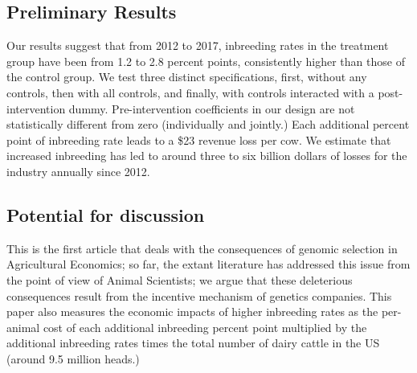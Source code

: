 \documentclass[12pt,letterpaper]{article}
\begin{document}
\subsection*{Preliminary Results}
Our results suggest that from 2012 to 2017, inbreeding rates in the treatment group have been from 1.2 to 2.8 percent points, consistently higher than those of the control group. We test three distinct specifications, first, without any controls, then with all controls, and finally, with controls interacted with a post-intervention dummy. Pre-intervention coefficients in our design are not statistically different from zero (individually and jointly.) Each additional percent point of inbreeding rate leads to a \$23 revenue loss per cow. We estimate that increased inbreeding has led to around three to six billion dollars of losses for the industry annually since 2012. 

\subsection*{Potential for discussion}
This is the first article that deals with the consequences of genomic selection in Agricultural Economics; so far, the extant literature has addressed this issue from the point of view of Animal Scientists; we argue that these deleterious consequences result from the incentive mechanism of genetics companies. This paper also measures the economic impacts of higher inbreeding rates as the per-animal cost of each additional inbreeding percent point multiplied by the additional inbreeding rates times the total number of dairy cattle in the US (around 9.5 million heads.)



\end{document}

